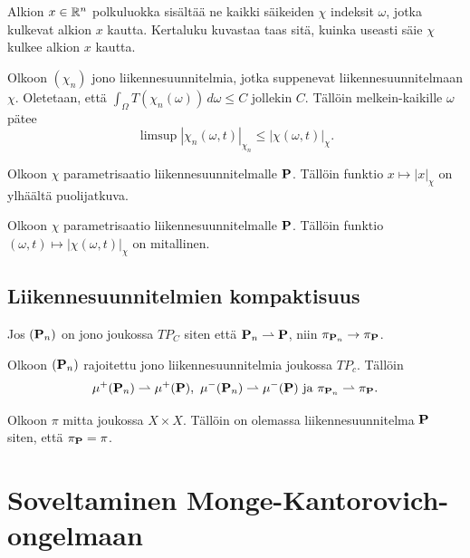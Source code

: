 Alkion $x\in \R^n$ polkuluokka sisältää ne kaikki säikeiden $\chi$ indeksit $\omega$, jotka kulkevat alkion $x$ kautta. Kertaluku kuvastaa taas sitä, kuinka useasti säie $\chi$ kulkee alkion $x$ kautta.

\begin{theorem}
    Olkoon $(\chi_n)$ jono liikennesuunnitelmia, jotka suppenevat liikennesuunnitelmaan $\chi$. Oletetaan, että $\int_\Omega T(\chi_n(\omega))\, d\omega \le C$ jollekin $C$. Tällöin melkein-kaikille $\omega$ pätee
    \begin{equation*}
        \limsup |\chi_n(\omega, t)|_{\chi_n} \le |\chi(\omega, t)|_\chi.
    \end{equation*}
\end{theorem}
\begin{lemma}
    Olkoon $\chi$ parametrisaatio liikennesuunnitelmalle $\P$. Tällöin funktio $x \mapsto |x|_\chi$ on ylhäältä puolijatkuva.
\end{lemma}

\begin{corollary}
    Olkoon $\chi$ parametrisaatio liikennesuunnitelmalle $\P$. Tällöin funktio $(\omega, t) \mapsto |\chi(\omega, t)|_\chi$ on mitallinen.
\end{corollary}

\subsection{Liikennesuunnitelmien  kompaktisuus}

\begin{theorem}
    Jos $(\P_n)$ on jono joukossa $TP_C$ siten että $\P_n \rightharpoonup \P$, niin $\pi_{\P_n} \to \pi_\P$.
\end{theorem}

\begin{theorem}
Olkoon $(\P_n)$ rajoitettu jono liikennesuunnitelmia joukossa $TP_c$. Tällöin
\begin{equation*}
    \mu^+(\P_n) \rightharpoonup \mu^+(\P), \ \mu^-(\P_n) \rightharpoonup \mu^-(\P) \text{ ja } \pi_{\P_n} \rightharpoonup \pi_\P.
\end{equation*}
\end{theorem}

\begin{corollary}
    Olkoon $\pi$ mitta joukossa $X \times X$. Tällöin on olemassa liikennesuunnitelma $\P$ siten, että $\pi_\P = \pi$.
\end{corollary}

\section{Soveltaminen Monge-Kantorovich-ongelmaan}
